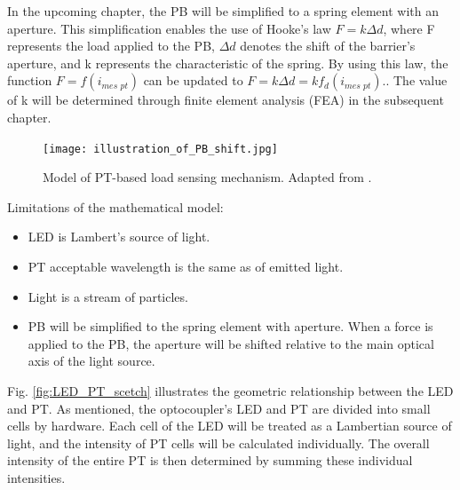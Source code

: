 In the upcoming chapter, the PB will be simplified to a spring element with an aperture. 
This simplification enables the use of Hooke's law $F = k\Delta d$, where F represents the load applied 
to the PB, $\Delta d$ denotes the shift of the barrier's aperture, and k represents the 
characteristic of the spring. 
By using this law, the function $F = f(i_{\textit{mes pt}})$ can be updated to $F = k \Delta d = k f_d(i_{\textit{mes pt}})$..
The value of k will be determined through finite element analysis (FEA) in the subsequent chapter. 

\begin{figure}[H]
  \centering
  \texttt{[image: illustration\_of\_PB\_shift.jpg]}
  \caption{Model of PT-based load sensing mechanism. Adapted from \cite[Fig. 1]{my_love_pressure_photosensor}.}
  \label{fig:load_pt_based_mechanism}
  \end{figure}

Limitations of the mathematical model:
\begin{itemize}
    \item LED is Lambert's source of light.
    \item PT acceptable wavelength is the same as of emitted light.
    \item Light is a stream of particles.
    \item PB will be simplified to the spring element with aperture. When a force is applied to the PB, the aperture will be shifted relative to the main optical axis of the light source.
\end{itemize}

Fig. \ref{fig:LED_PT_scetch} illustrates the geometric relationship between the LED and PT. 
As mentioned, the optocoupler's LED and PT are divided into small cells by hardware.
 Each cell of the LED will be treated as a Lambertian source of light, and the intensity 
 of PT cells will be calculated individually. 
 The overall intensity of the entire PT is then determined by summing these individual intensities. 

